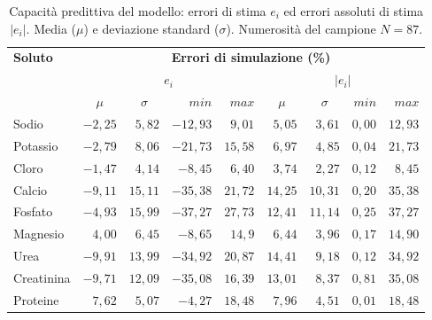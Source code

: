 \documentclass[10pt,twoside]{book}
\begin{document}
\begin{table}[htb]
	\centering
	\caption{Capacità predittiva del modello: errori di stima $e_i$ ed errori assoluti di stima $|e_i|$. Media ($\mu$) e deviazione standard ($\sigma$). Numerosità del campione $N=87$.}\label{tab:descrizione}
	\begin{tabular}{lrrrrrrrr}
	\toprule 
		\textbf{Soluto}   &  \multicolumn{8}{c}{\textbf{Errori di simulazione (\%)}}  \\
		\cmidrule(lr){2-9}
				              &        \multicolumn{4}{c}{$e_i$}             &       \multicolumn{4}{c}{$|e_i|$}             \\
		                  & \multicolumn{1}{c}{$\mu$}      & \multicolumn{1}{c}{$\sigma$}   & $min$   & $max$   & \multicolumn{1}{c}{$\mu$}     & \multicolumn{1}{c}{$\sigma$}   & $min$   & $max$  \\
    \cmidrule(lr){2-5}\cmidrule(lr){6-9}
  	Sodio             & $ -2,25$    & $ 5,82$    & $ -12,93$  & $9,01$   & $5,05$   & $3,61$     & $0,00$ & $12,93$   \\
  	Potassio          & $-2,79$     & $ 8,06$    & $-21,73$   & $15,58$  & $6,97$   & $4,85$     & $0,04$ & $21,73$  \\
  	Cloro             & $-1,47$     & $ 4,14$    & $ -8,45$   & $6,40$   & $3,74$   & $2,27$     & $0,12$ & $ 8,45$   \\
  	Calcio            & $-9,11$     & $ 15,11$   & $ -35,38$  & $21,72$  & $14,25$  & $10,31$    & $0,20$ & $35,38$  \\
  	Fosfato           & $-4,93$     & $ 15,99$   & $-37,27$   & $27,73$  & $12,41$  & $11,14$    & $0,25$ & $37,27$  \\
  	Magnesio          & $ 4,00$     & $ 6,45$    & $ -8,65$   & $14,9$   & $6,44$   & $3,96$     & $0,17$ & $14,90$  \\
  	Urea              & $-9,91$     & $13,99$    & $-34,92$   & $20,87$  & $14,41$  & $9,18$     & $0,12$ & $34,92$  \\
  	Creatinina        & $-9,71$     & $12,09$    & $-35,08$   & $16,39$  & $13,01$  & $8,37$     & $0,81$ & $35,08$  \\
  	Proteine          & $ 7,62$     & $5,07$     & $ -4,27$   & $18,48$  & $7,96$   & $4,51$     & $0,01$ & $18,48$  \\
  \bottomrule
\end{tabular}
\end{table}
\end{document}
